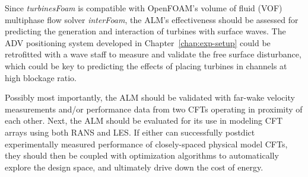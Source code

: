 Since \textit{turbinesFoam} is compatible with OpenFOAM's volume of fluid (VOF)
multiphase flow solver \textit{interFoam}, the ALM's effectiveness should be
assessed for predicting the generation and interaction of turbines with surface
waves. The ADV positioning system developed in Chapter~\ref{chap:exp-setup}
could be retrofitted with a wave staff to measure and validate the free surface
disturbance, which could be key to predicting the effects of placing turbines in
channels at high blockage ratio.

Possibly most importantly, the ALM should be validated with far-wake velocity
measurements and/or performance data from two CFTs operating in proximity of
each other. Next, the ALM should be evaluated for its use in modeling CFT arrays
using both RANS and LES. If either can successfully postdict experimentally
measured performance of closely-spaced physical model CFTs, they should then be
coupled with optimization algorithms to automatically explore the design space,
and ultimately drive down the cost of energy.

